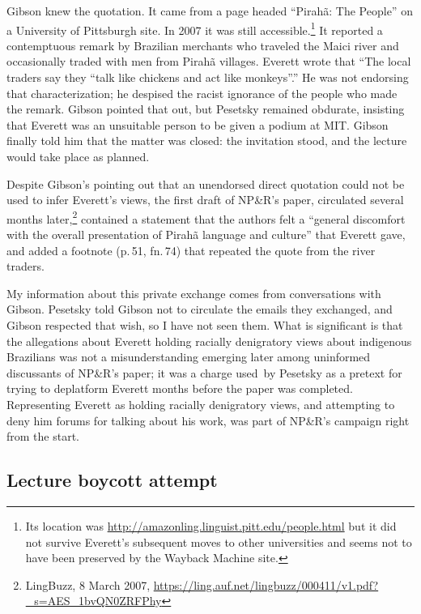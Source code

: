 \documentclass[output=paper,colorlinks,citecolor=brown
]{langscibook}
\begin{document}
Gibson knew the quotation. It came from a page headed ``Pirah{\~a}:
The People'' on a University of Pittsburgh site. In 2007 it was still
accessible.\footnote{%
  Its location was \url{http://amazonling.linguist.pitt.edu/people.html}
  but it did not survive Everett's subsequent moves to other universities
  and seems not to have been preserved by the Wayback Machine site.}
It reported a contemptuous remark by Brazilian merchants who traveled
the Maici river and occasionally traded with men from Pirah{\~a} villages.
Everett wrote that ``The local traders say they ``talk like chickens and
act like monkeys''.'' He was not endorsing that characterization; he
despised the racist ignorance of the people who made the remark. Gibson
pointed that out, but Pesetsky remained obdurate, insisting that Everett
was an unsuitable person to be given a podium at MIT. Gibson finally
told him that the matter was closed: the invitation stood, and the
lecture would take place as planned.

Despite Gibson's pointing out that an unendorsed direct quotation could
not be used to infer Everett's views, the first draft of NP\&R's paper,
circulated several months later,\footnote{%
   LingBuzz, 8 March 2007,
   \url{https://ling.auf.net/lingbuzz/000411/v1.pdf?_s=AES_1bvQN0ZRFPhy}}
contained a statement that the authors felt a ``general discomfort with
the overall presentation of Pirahã language and culture'' that Everett
gave, and added a footnote (p.\,51, fn.\,74) that repeated the quote
from the river traders.

My information about this private exchange comes from conversations with
Gibson. Pesetsky told Gibson not to circulate the emails they exchanged,
and Gibson respected that wish, so I have not seen them. What is
significant is that the allegations about Everett holding racially
denigratory views about indigenous Brazilians was not a misunderstanding
emerging later among uninformed discussants of NP\&R's paper; it was a
charge used by Pesetsky as a pretext for trying to deplatform Everett
months before the paper was completed. Representing Everett as holding
racially denigratory views, and attempting to deny him forums for talking
about his work, was part of NP\&R’s campaign right from the start.

\subsection{Lecture boycott attempt}
\end{document}
